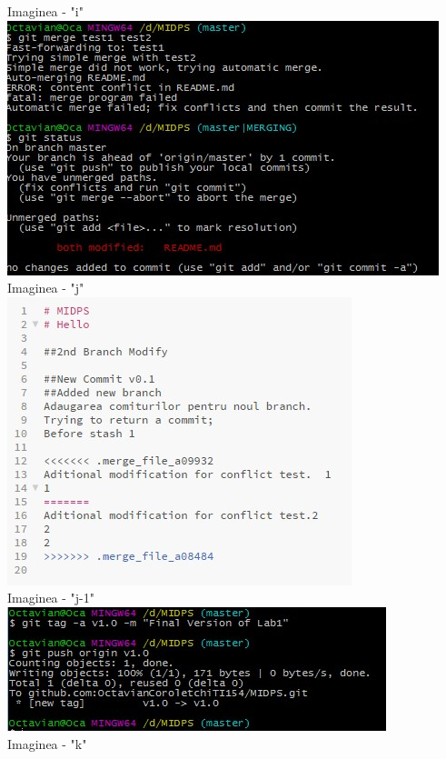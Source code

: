 \begin{center}
Imaginea - "i" \\
\vspace{10 mm}
\includegraphics[scale=1]{j} \\
Imaginea - "j" \\
\vspace{10 mm}
\includegraphics[scale=1]{j-1} \\
Imaginea - "j-1" \\
\vspace{10 mm}
\includegraphics[scale=1]{k}\\
Imaginea - "k" \\
\vspace{10 mm}
\end{center}


